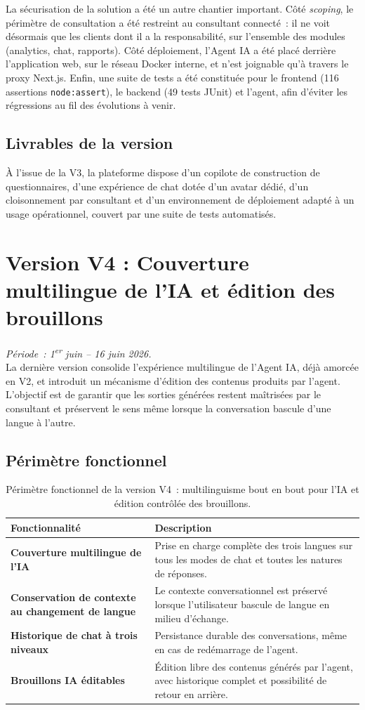 \documentclass[12pt,a4paper]{report}
\begin{document}
La sécurisation de la solution a été un autre chantier important. Côté \textit{scoping}, le périmètre de consultation a été restreint au consultant connecté~: il ne voit désormais que les clients dont il a la responsabilité, sur l'ensemble des modules (analytics, chat, rapports). Côté déploiement, l'Agent IA a été placé derrière l'application web, sur le réseau Docker interne, et n'est joignable qu'à travers le proxy Next.js. Enfin, une suite de tests a été constituée pour le frontend (116 assertions \texttt{node:assert}), le backend (49 tests JUnit) et l'agent, afin d'éviter les régressions au fil des évolutions à venir.

\subsection*{Livrables de la version}
À l'issue de la V3, la plateforme dispose d'un copilote de construction de questionnaires, d'une expérience de chat dotée d'un avatar dédié, d'un cloisonnement par consultant et d'un environnement de déploiement adapté à un usage opérationnel, couvert par une suite de tests automatisés.

\section{Version V4 : Couverture multilingue de l'IA et édition des brouillons}
\textit{Période~: 1\textsuperscript{er} juin -- 16 juin 2026.}\\[0.2cm]
La dernière version consolide l'expérience multilingue de l'Agent IA, déjà amorcée en V2, et introduit un mécanisme d'édition des contenus produits par l'agent. L'objectif est de garantir que les sorties générées restent maîtrisées par le consultant et préservent le sens même lorsque la conversation bascule d'une langue à l'autre.

\subsection*{Périmètre fonctionnel}
\begin{table}[H]
\centering
\caption{Périmètre fonctionnel de la version V4~: multilinguisme bout en bout pour l'IA et édition contrôlée des brouillons.}
\begin{tabularx}{\textwidth}{>{\bfseries}L{4.6cm}Y}
\toprule
Fonctionnalité & Description \\
\midrule
Couverture multilingue de l'IA & Prise en charge complète des trois langues sur tous les modes de chat et toutes les natures de réponses. \\
Conservation de contexte au changement de langue & Le contexte conversationnel est préservé lorsque l'utilisateur bascule de langue en milieu d'échange. \\
Historique de chat à trois niveaux & Persistance durable des conversations, même en cas de redémarrage de l'agent. \\
Brouillons IA éditables & Édition libre des contenus générés par l'agent, avec historique complet et possibilité de retour en arrière. \\
\bottomrule
\end{tabularx}
\label{tab:v4}
\end{table}
\end{document}
